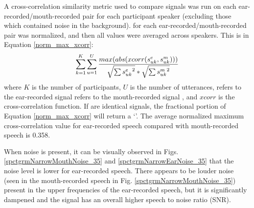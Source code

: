 \DIFaddend A cross-correlation similarity metric used to compare signals was run on each ear-recorded/mouth-recorded pair for each participant speaker (excluding those which contained noise in the background).  \DIFdelbegin {}\DIFdelend \DIFaddbegin {}\DIFaddend for each ear-recorded/mouth-recorded pair \DIFdelbegin \DIFdel{, }\DIFdelend \DIFaddbegin {}\DIFaddend was normalized, and then all \DIFaddbegin {}\DIFaddend values were averaged across speakers.  This is \DIFdelbegin {}\DIFdelend \DIFaddbegin {}\DIFaddend in Equation \ref{norm_max_xcorr}:
%
\begin{equation}\label{norm_max_xcorr}
\sum_{k=1}^{K} \sum_{u=1}^{U} \DIFdelbegin %
\DIFdelend \DIFaddbegin \dfrac{max(abs(xcorr(s^e_{uk}, s^m_{uk})))}{\sqrt{\sum {s^e_{uk}}^2}*\sqrt{\sum {s^m_{uk}}^2}}
\DIFaddend \end{equation}
%
where $K$ is the number of participants, $U$ is the number of utterances, \DIFdelbegin {}\DIFdelend \DIFaddbegin {}\DIFaddend refers to the ear-recorded signal \DIFdelbegin {}\DIFdelend \DIFaddbegin {}\DIFaddend refers to the mouth-recorded signal \DIFaddbegin {}\DIFaddend , and $xcorr$ is the cross-correlation function. If \DIFdelbegin {}\DIFdelend \DIFaddbegin {}\DIFaddend are identical signals, the fractional portion of Equation \ref{norm_max_xcorr} will return a `\DIFdelbegin {}\DIFdelend \DIFaddbegin {}\DIFaddend '.  The \DIFaddbegin {}\DIFaddend average normalized maximum cross-correlation value for ear-recorded speech compared with mouth-recorded speech is 0.358.

When noise is present, it can be visually observed in Figs. \ref{spctgrmNarrowMouthNoise_35} and \ref{spctgrmNarrowEarNoise_35} that the noise level is lower for ear-recorded speech.  There appears to be \DIFdelbegin {}\DIFdelend louder noise (seen in the mouth-recorded speech in Fig. \ref{spctgrmNarrowMouthNoise_35}) \DIFaddbegin {}\DIFaddend present in the upper frequencies of the ear-recorded speech, but it is significantly dampened and the signal has an overall higher speech to noise ratio (SNR).

